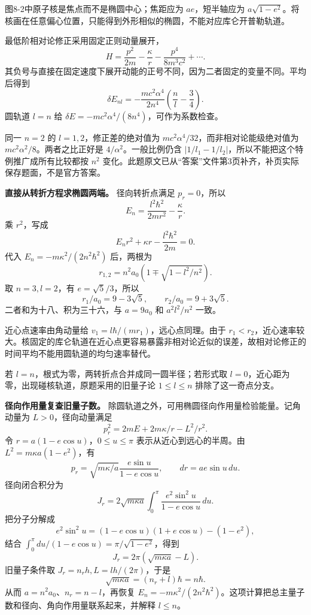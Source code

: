 \documentclass[12pt,a4paper,UTF8]{ctexart}
\begin{document}
图8-2中原子核是焦点而不是椭圆中心；焦距应为 \(ae\)，短半轴应为
\(a\sqrt{1-e^2}\)。将核画在任意偏心位置，只能得到外形相似的椭圆，不能对应库仑开普勒轨道。

最低阶相对论修正采用固定正则动量展开， \[
H=\frac{p^2}{2m}-\frac\kappa r-\frac{p^4}{8m^3c^2}+\cdots.
\]
其负号与直接在固定速度下展开动能的正号不同，因为二者固定的变量不同。平均后得到
\[
\delta E_{nl}=-\frac{mc^2\alpha^4}{2n^4}\left(\frac nl-\frac34\right).
\] 圆轨道 \(l=n\) 给 \(\delta E=-mc^2\alpha^4/(8n^4)\)，可作为系数检查。

同一 \(n=2\) 的 \(l=1,2\)，修正差的绝对值为
\(mc^2\alpha^4/32\)，而非相对论能级绝对值为
\(mc^2\alpha^2/8\)。两者之比正好是 \(4/\alpha^2\)。一般比例仍含
\(|1/l_1-1/l_2|\)，所以不能把这个特例推广成所有比较都按 \(n^2\)
变化。此题原文已从``答案''文件第3页补齐，补页实际保存题面，不是官方答案。

\textbf{直接从转折方程求椭圆两端。} 径向转折点满足 \(p_r=0\)，所以 \[
E_n=\frac{l^2\hbar^2}{2mr^2}-\frac\kappa r.
\] 乘 \(r^2\)，写成 \[
E_nr^2+\kappa r-\frac{l^2\hbar^2}{2m}=0.
\] 代入 \(E_n=-m\kappa^2/(2n^2\hbar^2)\) 后，两根为 \[
r_{1,2}=n^2a_0\left(1\mp\sqrt{1-l^2/n^2}\right).
\] 取 \(n=3,l=2\)，有 \(e=\sqrt5/3\)，所以 \[
r_1/a_0=9-3\sqrt5,\qquad r_2/a_0=9+3\sqrt5.
\] 二者和为十八、积为三十六，与 \(a=9a_0\) 和 \(a^2l^2/n^2\) 一致。

近心点速率由角动量给 \(v_1=l\hbar/(mr_1)\)，远心点同理。由于
\(r_1<r_2\)，近心速率较大。核固定的库仑轨道在近心点更容易暴露非相对论近似的误差，故相对论修正的时间平均不能用圆轨道的均匀速率替代。

若 \(l=n\)，根式为零，两转折点合并成同一圆半径；若形式取
\(l=0\)，近心距为零，出现碰核轨道，原题采用的旧量子论 \(1\le l\le n\)
排除了这一奇点分支。

\textbf{径向作用量复查旧量子数。}
除圆轨道之外，可用椭圆径向作用量检验能量。记角动量为
\(L>0\)，径向动量满足 \[
p_r^2=2mE+2m\kappa/r-L^2/r^2.
\] 令 \(r=a(1-e\cos u)\)，\(0\le u\le\pi\) 表示从近心到远心的半周。由
\(L^2=m\kappa a(1-e^2)\)，有 \[
p_r=\sqrt{m\kappa/a}\frac{e\sin u}{1-e\cos u},
\qquad dr=ae\sin u\,du.
\] 径向闭合积分为 \[
J_r=2\sqrt{m\kappa a}
\int_0^\pi\frac{e^2\sin^2u}{1-e\cos u}\,du.
\] 把分子分解成 \[
e^2\sin^2u=(1-e\cos u)(1+e\cos u)-(1-e^2),
\] 结合 \(\int_0^\pi du/(1-e\cos u)=\pi/\sqrt{1-e^2}\)，得到 \[
J_r=2\pi(\sqrt{m\kappa a}-L).
\] 旧量子条件取 \(J_r=n_rh,L=lh/(2\pi)\)，于是 \[
\sqrt{m\kappa a}=(n_r+l)\hbar=n\hbar.
\] 从而 \(a=n^2a_0\)、\(n_r=n-l\)，再恢复
\(E_n=-m\kappa^2/(2n^2\hbar^2)\)。这项计算把总主量子数和径向、角向作用量联系起来，并解释
\(l\le n\)。
\end{document}
